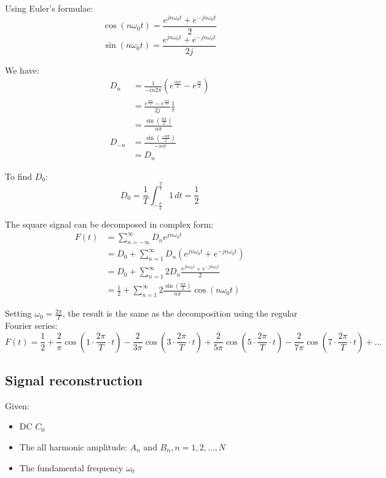 \documentclass[11pt]{article}
\begin{document}
Using Euler's formulae:
\[\cos (n \omega_0 t) = \frac{e^{jn \omega_0 t} + e^{-jn \omega_0 t}}{2}\]
\[\sin (n \omega_0 t) = \frac{e^{jn \omega_0 t} + e^{-jn \omega_0 t}}{2j}\]

We have:
\begin{align*}
D_n &= \frac{1}{-in 2 \pi} \left(e^{\frac{in \pi}{2}} - e^{\frac{in}{2}} \right) \\
&= \frac{e^{\frac{in \pi}{2}} - e^{\frac{in \pi}{2}}}{2j} \frac{1}{\pi} \\
&= \frac{\sin \left(\frac{n \pi}{2} \right)}{n \pi} \\
D_{-n} &= \frac{\sin \left(\frac{- n \pi}{2} \right)}{- n \pi} \\
&= D_n
\end{align*}

To find \(D_0\):
\[D_0 = \frac{1}{T} \int_{-\frac{T}{4}}^{\frac{T}{4}} 1 \, dt = \frac{1}{2}\]

The square signal can be decomposed in complex form:
\begin{align*}
F(t) &= \sum_{n = -\infty}^{\infty} D_n e^{jn \omega_0 t} \\
&= D_0 + \sum_{n = 1}^{\infty} D_n (e^{jn \omega_0 t} + e^{-jn \omega_0 t}) \\
&= D_0 + \sum_{n = 1}^{\infty} 2 D_n \frac{e^{jn \omega_0 t} + e^{-jn \omega_0 t}}{2} \\
&= \frac{1}{2} + \sum_{n = 1}^{\infty} 2 \frac{\sin \left(\frac{n \pi}{2} \right)}{n \pi} \cos (n \omega_0 t)
\end{align*}

Setting \(\omega_0 = \frac{2 \pi}{T}\), the result is the same as the decomposition using the regular Fourier series:
\[F(t) = \frac{1}{2} + \frac{2}{\pi} \cos \left(1 \cdot \frac{2 \pi}{T} \cdot t \right) - \frac{2}{3 \pi} \cos \left( 3 \cdot \frac{2 \pi}{T} \cdot t \right) + \frac{2}{5 \pi} \cos \left( 5 \cdot \frac{2 \pi}{T} \cdot t \right) - \frac{2}{7 \pi} \cos \left( 7 \cdot \frac{2 \pi}{T} \cdot t \right) + \ldots\]

 \newpage
\subsection{Signal reconstruction}
\label{sec:orgbb3bc31}
Given:
\begin{itemize}
\item DC \(C_0\)
\item The all harmonic amplitude: \(A_n \text{ and } B_n, n = 1, 2, \ldots, N\)
\item The fundamental frequency \(\omega_0\)
\end{itemize}
\end{document}
